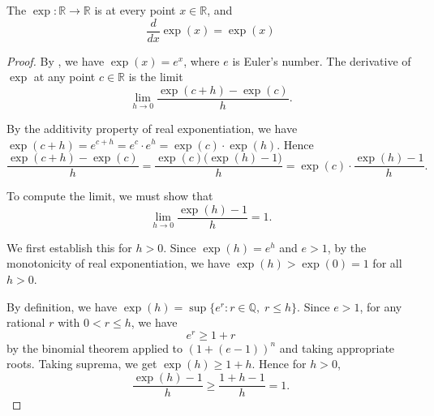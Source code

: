 \begin{proposition} \label{proposition:derivative_of_exponential_function_is_itself}
The  $\exp : \mathbb{R} \to \mathbb{R}$ is  at every point $x \in \mathbb{R}$, and
$$\frac{d}{dx} \exp(x) = \exp(x)$$
\end{proposition}
\begin{proof}
By , we have $\exp(x) = e^x$, where $e$ is Euler's number. The derivative of $\exp$ at any point $c \in \mathbb{R}$ is the limit
$$\lim_{h \to 0} \frac{\exp(c+h) - \exp(c)}{h}.$$

By the additivity property of real exponentiation, we have $\exp(c+h) = e^{c+h} = e^c \cdot e^h = \exp(c) \cdot \exp(h)$. Hence
$$\frac{\exp(c+h) - \exp(c)}{h} = \frac{\exp(c)\bigl(\exp(h) - 1\bigr)}{h} = \exp(c) \cdot \frac{\exp(h) - 1}{h}.$$

To compute the limit, we must show that
$$\lim_{h \to 0} \frac{\exp(h) - 1}{h} = 1.$$

We first establish this for $h > 0$. Since $\exp(h) = e^h$ and $e > 1$, by the monotonicity of real exponentiation, we have $\exp(h) > \exp(0) = 1$ for all $h > 0$.


By definition, we have $\exp(h) = \sup\{e^r : r \in \mathbb{Q},\; r \leq h\}$. Since $e > 1$, for any rational $r$ with $0 < r \leq h$, we have
$$e^r \geq 1 + r$$
by the binomial theorem applied to $(1+(e-1))^n$ and taking appropriate roots. Taking suprema, we get $\exp(h) \geq 1 + h$. Hence for $h > 0$,
$$\frac{\exp(h) - 1}{h} \geq \frac{1+h-1}{h} = 1.$$


\end{proof}
